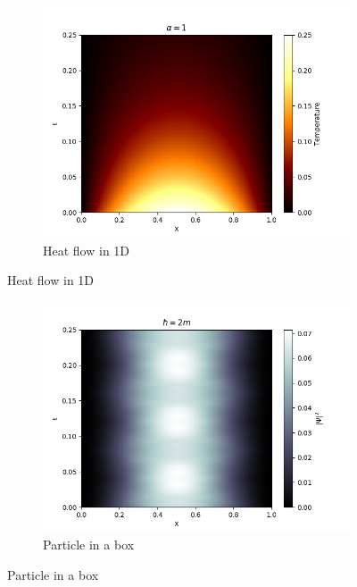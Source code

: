 \documentclass[10pt]{article}
\begin{document}
        \begin{figure}[h]\ContinuedFloat
        \centering
        \begin{subfigure}[b]{0.9\textwidth}
                \includegraphics[width=\textwidth]{./heat_flow.png}
                \caption{Heat flow in 1D}
        \end{subfigure}
        \end{figure}
        \begin{figure}[h]\ContinuedFloat
        \centering
        \begin{subfigure}[b]{0.9\textwidth}
                \includegraphics[width=\textwidth]{./particle_in_a_box.png}
                \caption{Particle in a box}
        \end{subfigure}
        \end{figure}
\end{document}
